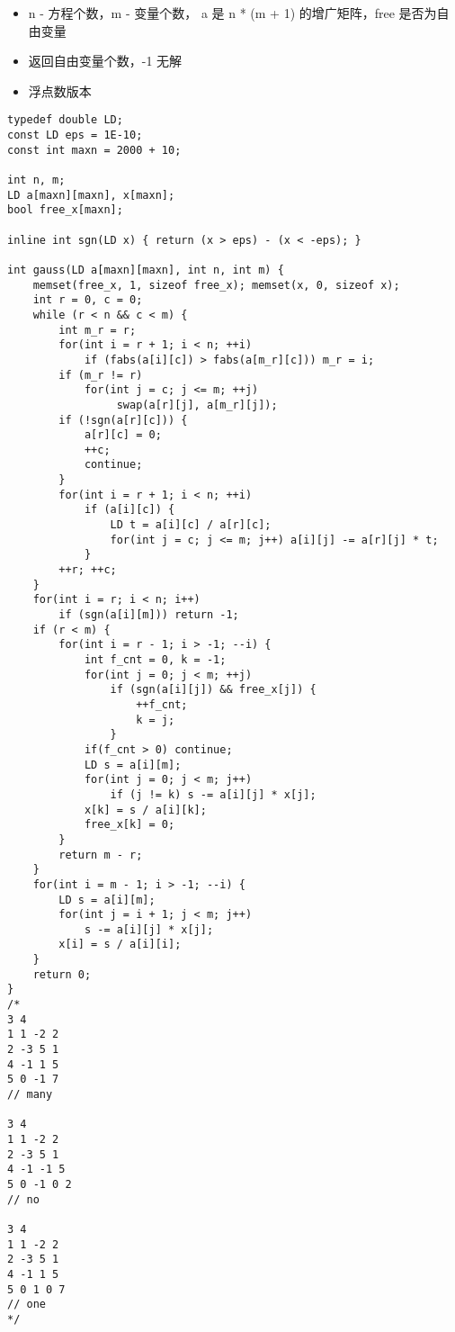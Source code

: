 \documentclass[]{article}
\begin{document}
\begin{itemize}
\item
  n - 方程个数，m - 变量个数， a 是 n * (m + 1) 的增广矩阵，free
  是否为自由变量
\item
  返回自由变量个数，-1 无解
\item
  浮点数版本
\end{itemize}

\begin{verbatim}
typedef double LD;
const LD eps = 1E-10;
const int maxn = 2000 + 10;

int n, m;
LD a[maxn][maxn], x[maxn];
bool free_x[maxn];

inline int sgn(LD x) { return (x > eps) - (x < -eps); }

int gauss(LD a[maxn][maxn], int n, int m) {
    memset(free_x, 1, sizeof free_x); memset(x, 0, sizeof x);
    int r = 0, c = 0;
    while (r < n && c < m) {
        int m_r = r;
        for(int i = r + 1; i < n; ++i)
            if (fabs(a[i][c]) > fabs(a[m_r][c])) m_r = i;
        if (m_r != r)
            for(int j = c; j <= m; ++j)
                 swap(a[r][j], a[m_r][j]);
        if (!sgn(a[r][c])) {
            a[r][c] = 0;
            ++c;
            continue;
        }
        for(int i = r + 1; i < n; ++i)
            if (a[i][c]) {
                LD t = a[i][c] / a[r][c];
                for(int j = c; j <= m; j++) a[i][j] -= a[r][j] * t;
            }
        ++r; ++c;
    }
    for(int i = r; i < n; i++)
        if (sgn(a[i][m])) return -1;
    if (r < m) {
        for(int i = r - 1; i > -1; --i) {
            int f_cnt = 0, k = -1;
            for(int j = 0; j < m; ++j)
                if (sgn(a[i][j]) && free_x[j]) {
                    ++f_cnt;
                    k = j;
                }
            if(f_cnt > 0) continue;
            LD s = a[i][m];
            for(int j = 0; j < m; j++)
                if (j != k) s -= a[i][j] * x[j];
            x[k] = s / a[i][k];
            free_x[k] = 0;
        }
        return m - r;
    }
    for(int i = m - 1; i > -1; --i) {
        LD s = a[i][m];
        for(int j = i + 1; j < m; j++)
            s -= a[i][j] * x[j];
        x[i] = s / a[i][i];
    }
    return 0;
}
/*
3 4
1 1 -2 2
2 -3 5 1
4 -1 1 5
5 0 -1 7
// many

3 4
1 1 -2 2
2 -3 5 1
4 -1 -1 5
5 0 -1 0 2
// no

3 4
1 1 -2 2
2 -3 5 1
4 -1 1 5
5 0 1 0 7
// one
*/
\end{verbatim}
\end{document}
